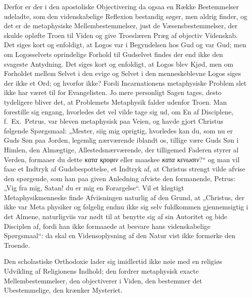 \documentclass[12pt]{book}
\begin{document}
Derfor er der i den apostoliske Objectivering da ogsaa en Række
Bestemmelser udeladte, som den videnskabelige Reflexion bestandig
søger, men aldrig finder, og det er de metaphysiske
Mellembestemmelser, just de Væsensbestemmelser, der skulde opløfte
Troen til Viden og give Troeslæren Præg af objectiv Videnskab. Det
siges kort og enfoldigt, at Logos var i Begyndelsen hos Gud og var
Gud; men om Logosselvets oprindelige Forhold til Gudselvet findes
der end ikke den svageste Antydning. Det siges kort og enfoldigt, at
Logos blev Kjød, men om Forholdet mellem Selvet i den evige og
Selvet i den menneskeblevne Logos siges der ikke et Ord; og hvorfor
ikke? Fordi Incarnationens metaphysiske Problem slet ikke har været
til for Evangelisten. Jo mere personligt Sagen tages, desto
tydeligere bliver det, at Problemets Metaphysik falder udenfor
Troen. Man forestille sig engang, hvorledes det vel vilde tage sig
ud, om En af Disciplene, f.\ Ex.\ Petrus, var bleven metaphysisk paa
Veien, og havde gjort Christus følgende Spørgsmaal: „Mester, siig
mig oprigtig, hvorledes kan du, som nu er Guds Søn paa Jorden,
legemlig nærværende iblandt os, tillige være Guds Søn i Himlen, den
Almægtige, Allestedsnærværende, der tilligemed Faderen styrer al
Verden, formaaer du dette \textit{κατα κρυφιν} eller maaskee
\textit{κατα κενωσιν}?“ og man vil faae et Indtryk af
Gudsbespottelse, et Indtryk af, at Christus strengt vilde afvise den
spørgende, som han paa given Anledning afviste den formanende,
Petrus: „Vig fra mig, Satan! du er mig en Forargelse“. Vil et
kløgtigt Metaphysikmenneske finde Afviisningen naturlig af den
Grund, at „Christus, der ikke var Meta\-
physiker og følgelig endnu ikke sig selv fuldkommen gjennemsigtig i
det Almene, naturligviis var nødt til at benytte sig af sin
Autoritet og bide Disciplen af, fordi han ikke formaaede at besvare
hans videnskabelige Spørgsmaal“: da skal en Vidensoplysning af den
Natur vist ikke formørke den Troende.

Den scholastiske Orthodoxie lader sig imidlertid ikke nøie med en
religiøs Udvikling af Religionens Indhold; den fordrer metaphysisk
exacte Mellembestemmelser, den objectiverer i Viden, den bestemmer
det Ubestemmelige, den krænker Mysteriet.
\end{document}
